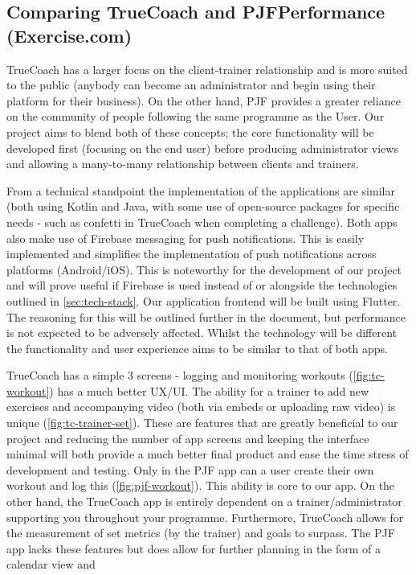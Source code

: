 \subsection{Comparing TrueCoach and PJFPerformance (Exercise.com)}
TrueCoach has a larger focus on the client-trainer relationship and is more suited to
the public (anybody can become an administrator and begin using their platform for their business).
On the other hand, PJF provides a greater reliance on the community of people following the same 
programme as the User. Our project aims to blend both of these concepts; the core functionality will be developed first (focusing on the end user)
before producing administrator views and allowing a many-to-many relationship between clients and trainers.
\par
From a technical standpoint the implementation of the applications are similar (both using Kotlin and Java, with
some use of open-source packages for specific needs - such as confetti in TrueCoach when completing a challenge).
Both apps also make use of Firebase messaging for push notifications. This is easily implemented
and simplifies the implementation of push notifications across platforms (Android/iOS). This is noteworthy for
the development of our project and will prove useful if Firebase is used instead of or alongside the technologies outlined
in \cref{sec:tech-stack}. Our application frontend will be built
using Flutter. The reasoning for this will be outlined further in the document, but performance is not expected to be adversely affected.
Whilst the technology will be different the functionality and user experience aims to be similar to that of both apps.
\par
TrueCoach has a simple 3 screens - logging and monitoring workouts (\cref{fig:tc-workout}) has a much better UX/UI.
The ability for a trainer to add new exercises and accompanying video
 (both via embeds or uploading raw video) is unique (\cref{fig:tc-trainer-set}). These are features that are
greatly beneficial to our project and reducing the number of app screens and keeping the interface minimal will
both provide a much better final product and ease the time stress of development and testing.
Only in the PJF app can a user create their own workout and log this (\cref{fig:pjf-workout}). This ability is
core to our app. On the other hand, the TrueCoach app is entirely dependent
on a trainer/administrator supporting you throughout your programme. Furthermore,
TrueCoach allows for the measurement of set metrics (by the trainer) and goals to surpass.
The PJF app lacks these features but does allow for further planning in the form of a calendar view and 

